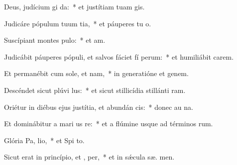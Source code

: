 \item Deus, judícium  gi da:~* et justítiam tuam  gis.
\item Judicáre pópulum tuum  tia,~* et páuperes tu  o.
\item Suscípiant montes  pulo:~* et  am.
\item Judicábit páuperes pópuli, et salvos fáciet fí perum:~* et humiliábit carem.
\item Et permanébit cum sole, et  nam,~* in generatióne et genem.
\item Descéndet sicut plúvi  lus:~* et sicut stillicídia stillánti  ram.
\item Oriétur in diébus ejus justítia, et abundán cis:~* donec au na.
\item Et dominábitur a mari us  re:~* et a flúmine usque ad términos  rum.
\item Glória Pa,  lio,~* et Spi to.
\item Sicut erat in princípio, et ,  per,~* et in sǽcula sæ. men.
